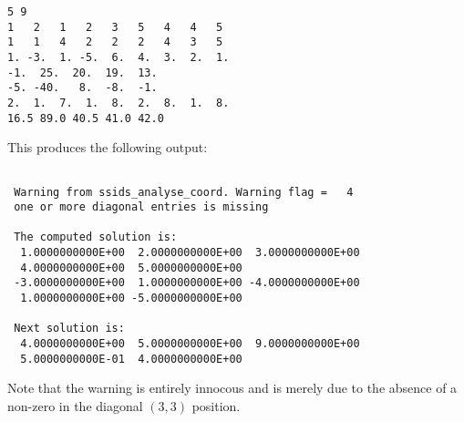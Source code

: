 \documentclass{spral}
\begin{document}
\begin{verbatim}
5 9
1   2   1   2   3   5   4   4   5
1   1   4   2   2   2   4   3   5
1. -3.  1. -5.  6.  4.  3.  2.  1.
-1.  25.  20.  19.  13.
-5. -40.   8.  -8.  -1.
2.  1.  7.  1.  8.  2.  8.  1.  8.
16.5 89.0 40.5 41.0 42.0
\end{verbatim}
\noindent
This produces the following output:
\begin{verbatim}

 Warning from ssids_analyse_coord. Warning flag =   4
 one or more diagonal entries is missing

 The computed solution is:
  1.0000000000E+00  2.0000000000E+00  3.0000000000E+00
  4.0000000000E+00  5.0000000000E+00
 -3.0000000000E+00  1.0000000000E+00 -4.0000000000E+00
  1.0000000000E+00 -5.0000000000E+00

 Next solution is:
  4.0000000000E+00  5.0000000000E+00  9.0000000000E+00
  5.0000000000E-01  4.0000000000E+00
\end{verbatim}
Note that the warning is entirely innocous and is merely due to the absence of
a non-zero in the diagonal $(3,3)$ position.

\begin{funders}
\end{funders}
\end{document}
